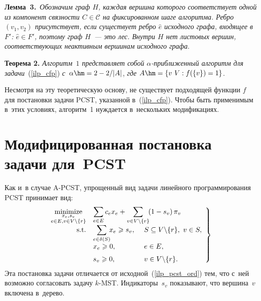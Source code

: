 \begin{multicols}{2}
\smallskip

\noindent
\textbf{Лемма~3.}\
\textit{Обозначим граф $H$, каждая вершина которого соответствует одной из компонент 
связ\-ности $C\in\mathcal{C}$ на фиксированном шаге алгоритма. Ребро $(v_1,v_2)$ 
присутствует, если существует ребро $\hat{e}$ исходного графа, входящее в~$F'$: 
$\hat{e} \in F'$, поэтому граф $H$~--- это лес. Внут\-ри $H$ нет листовых вершин, 
со\-от\-вет\-ст\-ву\-ющих неактивным вершинам исходного графа}.

\smallskip

\noindent
\textbf{Теорема 2.}
\textit{Алгоритм~$1$ представляет собой $\alpha$-при\-бли\-жен\-ный алгоритм для 
задачи}~(\ref{ilp_cfp}) \textit{с}~$\alpha \hm= 2 - {2}/{|A|}$, \textit{где} $A\hm=\{v\  V: 
f(\{v\})=1\}$.

\smallskip

Несмотря на эту теоретическую основу, не существует подходящей функции $f$ для 
постановки задачи PCST, указанной в~(\ref{ilp_cfp}). Чтобы быть 
применимым в~этих условиях, алгоритм~1 нуждается в~нескольких 
модификациях.

\vspace*{-9pt}

\section{Модифицированная постановка задачи для~PCST}

\vspace*{-3pt}

Как и~в случае A-PCST, упрощенный вид задачи линейного 
программирования PCST принимает вид:
\begin{equation}
\left.
\begin{array}{rll}
\!\!\!\underset{\substack{x_e,s_v \\ e\in E, v\in V\backslash \{r\}}}{\mbox{minimize}} & 
\displaystyle \sum\limits_{e\in E}c_ex_e + \sum\limits_{v\in V\backslash\{r\}}\!\! \left(1-s_v\right)\pi_v &\\[6pt]
\!\!\!\mbox{s.t.} & \displaystyle \sum\limits_{e\in\delta(S)} \!\! x_e\geqslant s_v, & \hspace*{-22mm}S\subseteq V\backslash \{r\},~v\in S,\\[6pt]
\!\!\!& x_e\geqslant 0, & \hspace*{-22mm}e\in E,\\[6pt]
\!\!\!& s_v\geqslant 0, & \hspace*{-22mm}v\in V\backslash \{r\}.
\end{array}
\right\}
\label{rlp_pcst_inord}
\end{equation}
Эта постановка задачи отличается от исходной~(\ref{ilp_pcst_ord}) тем, что с~ней 
возможно согласовать задачу $k$-MST. Индикаторы~$s_v$ показывают, что 
вершина~$v$ включена в~дерево.


\end{multicols}
